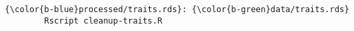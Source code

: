 \documentclass[class=minimal,border=0]{standalone}
\begin{document}
%
\begin{BVerbatim}[bgcolor=b-darkgrey]
{\color{b-blue}processed/traits.rds}: {\color{b-green}data/traits.rds}
        Rscript cleanup-traits.R
\end{BVerbatim}
\end{document}
